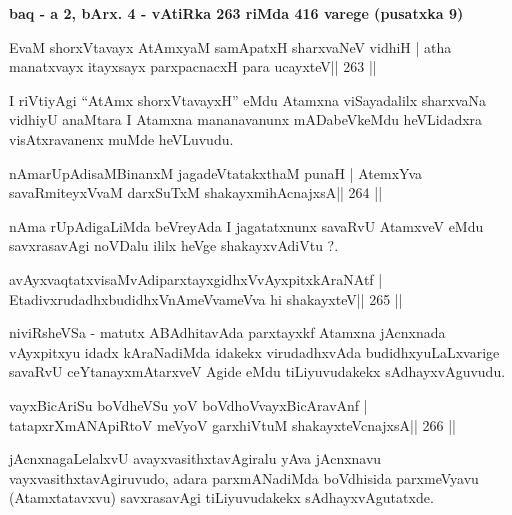 \begin{center}
{\large\bf baq - a 2, bArx. 4 - vAtiRka 263 riMda 416 varege (pusatxka 9)}
\end{center}

\begin{shl}
EvaM shorxVtavayx AtAmx\s yaM samApatxH sharxvaNeV vidhiH |
atha manatxvayx itayxsayx parxpacnacxH para ucayxteV\hfill || 263 ||
\end{shl}

\begin{artha}
I riVtiyAgi ``AtAmx shorxVtavayxH'' eMdu Atamxna viSayadalilx sharxvaNa vidhiyU anaMtara I Atamxna mananavanunx mADabeVkeMdu heVLidadxra visAtxravanenx muMde heVLuvudu.
\end{artha}


\begin{shl}
nAmarUpAdisaMBinanxM jagadeVtatakxthaM punaH |
AtemxYva savaRmiteyxVvaM darxSuTxM shakayxmihAcnajxsA\hfill || 264 ||
\end{shl}

\begin{artha}
nAma rUpAdigaLiMda beVreyAda I jagatatxnunx savaRvU AtamxveV eMdu savxrasavAgi noVDalu ililx heVge shakayxvAdiVtu ?.
\end{artha}


\begin{shl}
avAyxvaqtatxvisaMvAdiparxtayxgidhxVvAyxpitxkAraNAtf |
EtadivxrudadhxbudidhxVnAmeVvameVva hi shakayxteV\hfill || 265 ||
\end{shl}

\begin{artha}
niviRsheVSa - matutx ABAdhitavAda parxtayxkf Atamxna jAcnxnada vAyxpitxyu idadx kAraNadiMda idakekx virudadhxvAda budidhxyuLaLxvarige savaRvU ceYtanayxmAtarxveV Agide eMdu tiLiyuvudakekx sAdhayxvAguvudu.
\end{artha}

\begin{shl}
vayxBicAriSu boVdheVSu yoV boVdhoV\s vayxBicAravAnf |
tatapxrXmANApiRtoV meVyoV garxhiVtuM shakayxteV\s cnajxsA\hfill || 266 ||
\end{shl}

\begin{artha}
jAcnxnagaLelalxvU avayxvasithxtavAgiralu yAva jAcnxnavu vayxvasithxtavAgiruvudo, adara parxmANadiMda boVdhisida parxmeVyavu (Atamxtatavxvu) savxrasavAgi tiLiyu\-vudakekx sAdhayxvAgutatxde.
\end{artha}

